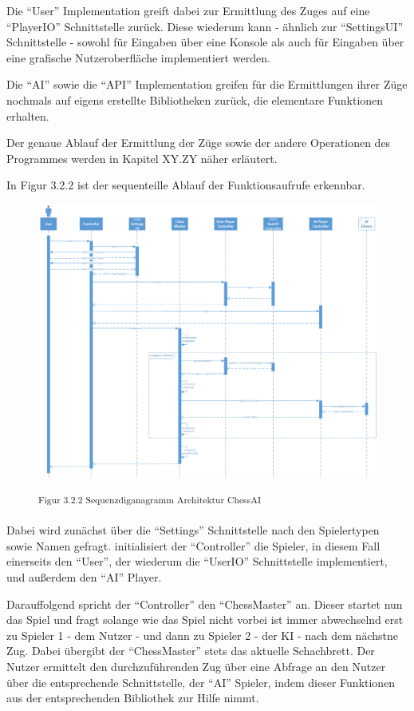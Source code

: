 Die ``User'' Implementation greift dabei zur Ermittlung des Zuges auf eine ``PlayerIO'' Schnittstelle zurück. Diese wiederum kann - ähnlich zur ``SettingsUI'' Schnittstelle - sowohl für Eingaben über eine Konsole als auch für Eingaben über eine grafische Nutzeroberfläche implementiert werden.

Die ``AI'' sowie die ``API'' Implementation greifen für die Ermittlungen ihrer Züge nochmals auf eigens erstellte Bibliotheken zurück, die elementare Funktionen erhalten.

Der genaue Ablauf der Ermittlung der Züge sowie der andere Operationen des Programmes werden in Kapitel XY.ZY näher erläutert.

In Figur 3.2.2 ist der sequenteille Ablauf der Funktionsaufrufe erkennbar.

\begin{figure}[h]
\centering
\includegraphics[width=\textwidth]{images/architecture_sequence_diagram.png}

\textsuperscript{Figur 3.2.2 Sequenzdiganagramm Architektur ChessAI}
\end{figure}

Dabei wird zunächst über die ``Settings'' Schnittstelle nach den Spielertypen sowie Namen gefragt. initialisiert der ``Controller'' die Spieler, in diesem Fall einerseits den ``User'', der wiederum die ``UserIO'' Schnittstelle implementiert, und außerdem den ``AI'' Player. 

Darauffolgend spricht der ``Controller'' den ``ChessMaster'' an. Dieser startet nun das Spiel und fragt solange wie das Spiel nicht vorbei ist immer abwechselnd erst zu Spieler 1 - dem Nutzer - und dann zu Spieler 2 - der KI - nach dem nächstne Zug. Dabei übergibt der ``ChessMaster'' stets das aktuelle Schachbrett. Der Nutzer ermittelt den durchzuführenden Zug über eine Abfrage an den Nutzer über die entsprechende Schnittstelle, der ``AI'' Spieler, indem dieser Funktionen aus der entsprechenden Bibliothek zur Hilfe nimmt.

